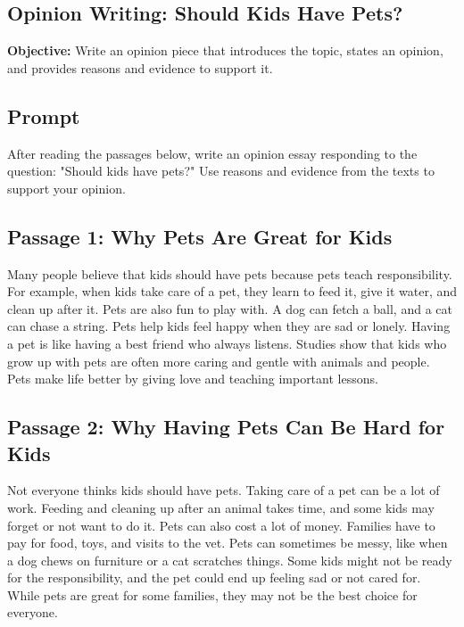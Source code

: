 \documentclass[12pt]{article}
\begin{document}
\subsection*{Opinion Writing: Should Kids Have Pets?}
\onehalfspacing

\begin{tcolorbox}[colframe=black!40, colback=gray!0, title=Learning Objective]
\textbf{Objective:} Write an opinion piece that introduces the topic, states an opinion, and provides reasons and evidence to support it.
\end{tcolorbox}

\subsection*{Prompt}

After reading the passages below, write an opinion essay responding to the question:  
"Should kids have pets?"  
Use reasons and evidence from the texts to support your opinion.

\subsection*{Passage 1: Why Pets Are Great for Kids}

Many people believe that kids should have pets because pets teach responsibility. For example, when kids take care of a pet, they learn to feed it, give it water, and clean up after it. Pets are also fun to play with. A dog can fetch a ball, and a cat can chase a string. Pets help kids feel happy when they are sad or lonely. Having a pet is like having a best friend who always listens. Studies show that kids who grow up with pets are often more caring and gentle with animals and people. Pets make life better by giving love and teaching important lessons.

\subsection*{Passage 2: Why Having Pets Can Be Hard for Kids}

Not everyone thinks kids should have pets. Taking care of a pet can be a lot of work. Feeding and cleaning up after an animal takes time, and some kids may forget or not want to do it. Pets can also cost a lot of money. Families have to pay for food, toys, and visits to the vet. Pets can sometimes be messy, like when a dog chews on furniture or a cat scratches things. Some kids might not be ready for the responsibility, and the pet could end up feeling sad or not cared for. While pets are great for some families, they may not be the best choice for everyone.
\newpage
\end{document}

